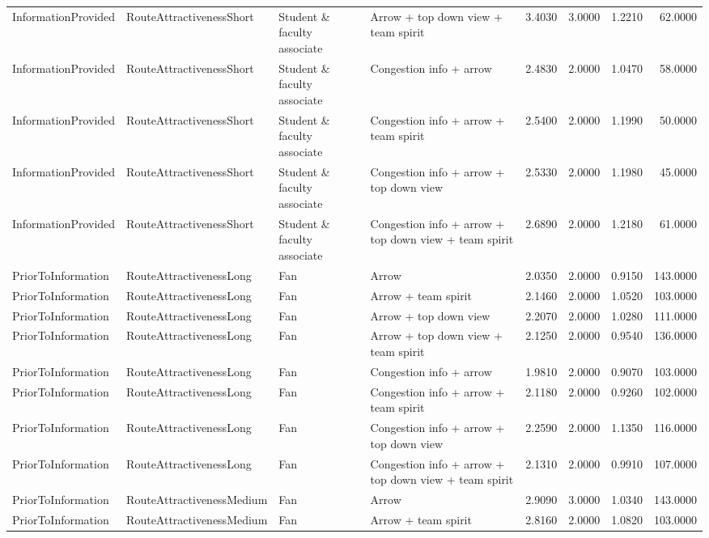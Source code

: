 \begin{tabular}{llllrrrr}
  InformationProvided & RouteAttractivenessShort & Student \& faculty associate & Arrow + top down view + team spirit & 3.4030 & 3.0000 & 1.2210 & 62.0000 \\ 
  InformationProvided & RouteAttractivenessShort & Student \& faculty associate & Congestion info + arrow & 2.4830 & 2.0000 & 1.0470 & 58.0000 \\ 
  InformationProvided & RouteAttractivenessShort & Student \& faculty associate & Congestion info + arrow + team spirit & 2.5400 & 2.0000 & 1.1990 & 50.0000 \\ 
  InformationProvided & RouteAttractivenessShort & Student \& faculty associate & Congestion info + arrow + top down view & 2.5330 & 2.0000 & 1.1980 & 45.0000 \\ 
  InformationProvided & RouteAttractivenessShort & Student \& faculty associate & Congestion info + arrow + top down view + team spirit & 2.6890 & 2.0000 & 1.2180 & 61.0000 \\ 
  PriorToInformation & RouteAttractivenessLong & Fan & Arrow & 2.0350 & 2.0000 & 0.9150 & 143.0000 \\ 
  PriorToInformation & RouteAttractivenessLong & Fan & Arrow + team spirit & 2.1460 & 2.0000 & 1.0520 & 103.0000 \\ 
  PriorToInformation & RouteAttractivenessLong & Fan & Arrow + top down view & 2.2070 & 2.0000 & 1.0280 & 111.0000 \\ 
  PriorToInformation & RouteAttractivenessLong & Fan & Arrow + top down view + team spirit & 2.1250 & 2.0000 & 0.9540 & 136.0000 \\ 
  PriorToInformation & RouteAttractivenessLong & Fan & Congestion info + arrow & 1.9810 & 2.0000 & 0.9070 & 103.0000 \\ 
  PriorToInformation & RouteAttractivenessLong & Fan & Congestion info + arrow + team spirit & 2.1180 & 2.0000 & 0.9260 & 102.0000 \\ 
  PriorToInformation & RouteAttractivenessLong & Fan & Congestion info + arrow + top down view & 2.2590 & 2.0000 & 1.1350 & 116.0000 \\ 
  PriorToInformation & RouteAttractivenessLong & Fan & Congestion info + arrow + top down view + team spirit & 2.1310 & 2.0000 & 0.9910 & 107.0000 \\ 
  PriorToInformation & RouteAttractivenessMedium & Fan & Arrow & 2.9090 & 3.0000 & 1.0340 & 143.0000 \\ 
  PriorToInformation & RouteAttractivenessMedium & Fan & Arrow + team spirit & 2.8160 & 2.0000 & 1.0820 & 103.0000 \\ 

\end{tabular}
